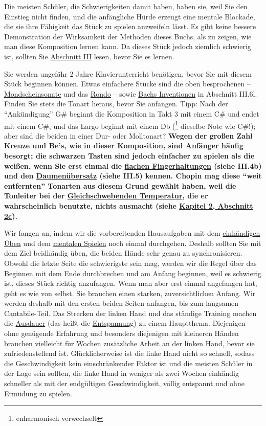 Die meisten Schüler, die Schwierigkeiten damit haben, haben sie, weil Sie den Einstieg nicht finden, und die anfängliche Hürde erzeugt eine mentale Blockade, die sie ihre Fähigkeit das Stück zu spielen anzweifeln lässt.
Es gibt keine bessere Demonstration der Wirksamkeit der Methoden dieses Buchs, als zu zeigen, wie man diese Komposition lernen kann.
Da dieses Stück jedoch ziemlich schwierig ist, sollten Sie \hyperref[c1iii1]{Abschnitt III} lesen, bevor Sie es lernen.

Sie werden ungefähr 2 Jahre Klavierunterricht benötigen, bevor Sie mit diesem Stück beginnen können.
Etwas einfachere Stücke sind die oben besprochenen -- \hyperref[c1ii25b]{Mondscheinsonate} und das \hyperref[c1ii25c]{Rondo} -- sowie \hyperref[c1iii6l2]{Bachs Inventionen} in Abschnitt III.6l.
Finden Sie stets die Tonart heraus, bevor Sie anfangen.
Tipp: Nach der \enquote{Ankündigung} G\# beginnt die Komposition in Takt 3 mit einem C\# und endet mit einem C\#, und das Largo beginnt mit einem Db (\footnote{enharmonisch verwechselt} dieselbe Note wie C\#!); aber sind die beiden in einer Dur- oder Molltonart?
\textbf{Wegen der großen Zahl Kreuze und Be's, wie in dieser Komposition, sind Anfänger häufig besorgt;
die schwarzen Tasten sind jedoch einfacher zu spielen als die weißen, wenn Sie erst einmal die \hyperref[c1iii4b]{flachen Fingerhaltungen} (siehe III.4b) und den \hyperref[c1iii5b]{Daumenübersatz} (siehe III.5) kennen.
Chopin mag diese \enquote{weit entfernten} Tonarten aus diesem Grund gewählt haben, weil die Tonleiter bei der \hyperref[et1]{Gleichschwebenden Temperatur}, die er wahrscheinlich benutzte, nichts ausmacht (siehe \hyperref[c2_2c]{Kapitel 2, Abschnitt 2c}).}

Wir fangen an, indem wir die vorbereitenden Hausaufgaben mit dem \hyperref[c1ii7]{einhändigen Üben} und dem \hyperref[c1ii12mental]{mentalen Spielen} noch einmal durchgehen.
Deshalb sollten Sie mit dem Ziel beidhändig üben, die beiden Hände sehr genau zu synchronisieren.
Obwohl die letzte Seite die schwierigste sein mag, werden wir die Regel über das Beginnen mit dem Ende durchbrechen und am Anfang beginnen, weil es schwierig ist, dieses Stück richtig anzufangen.
Wenn man aber erst einmal angefangen hat, geht es wie von selbst.
Sie brauchen einen starken, zuversichtlichen Anfang.
Wir werden deshalb mit den ersten beiden Seiten anfangen, bis zum langsamen Cantabile-Teil.
Das Strecken der linken Hand und das ständige Training machen die \hyperref[c1ii21]{Ausdauer} (das heißt die \hyperref[c1ii14]{Entspannung}) zu einem Hauptthema.
Diejenigen ohne genügende Erfahrung und besonders diejenigen mit kleineren Händen brauchen vielleicht für Wochen zusätzliche Arbeit an der linken Hand, bevor sie zufriedenstellend ist.
Glücklicherweise ist die linke Hand nicht so schnell, sodass die Geschwindigkeit kein einschränkender Faktor ist und die meisten Schüler in der Lage sein sollten, die linke Hand in weniger als zwei Wochen einhändig schneller als mit der endgültigen Geschwindigkeit, völlig entspannt und ohne Ermüdung zu spielen.

